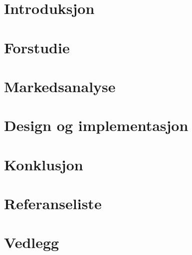 \documentclass[11pt, a4paper]{report}
\newcommand{\comment}[1]{} \comment{This is a block comment wrapped in curly brackets}
\begin{document}



%
\begin{abstract}
\noindent
%
\end{abstract}

\tableofcontents
\newpage
{}



\comment{ foreløpig struktur på rapport:
Sammendrag
Innhold
Introduksjon
	Gruppen
	Initiativet
	Problemet
	Ideen
Pre study
	Mekanikk
	Hardware
	Software
Markedsundersøkelse
	generelt
	4 p'er
Løsning
	valg av løsning
	hardware
	software
		GUI
	diskusjon
Konklusjon
Referanseliste
Vedlegg
}

\chapter{Introduksjon}
	
	
	


\chapter{Forstudie}
	
	
	
	
\chapter{Markedsanalyse}
	
\chapter{Design og implementasjon}
	
	
	
\chapter{Konklusjon}
\chapter{Referanseliste}
\chapter{Vedlegg}
%

\newpage
{}
\listoftables
{}
\listoffigures
{}



\newpage
{} %
\appendix
%
\end{document}
